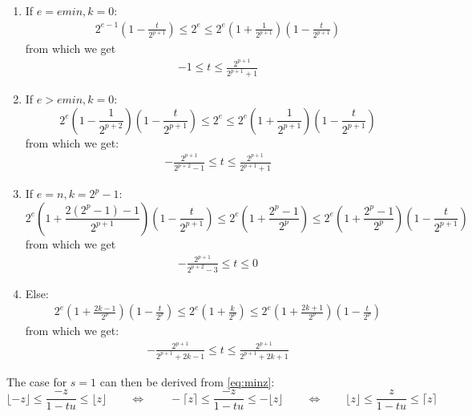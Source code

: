 \documentclass[10pt,a4paper]{article}
\theoremstyle{plain}
\theoremstyle{definition}
\newcommand{\ceil}[1]{\lceil #1 \rceil}
\newcommand{\floor}[1]{\lfloor #1 \rfloor}
\begin{document}
\begin{enumerate}
\item If $e=emin, k=0$:
\begin{align*}
2^{e-1}\left(1-\frac{t}{2^{p+1}}\right)\leq 2^e\leq 2^e\left(1+\frac{1}{2^{p+1}}\right)\left(1-\frac{t}{2^{p+1}}\right)
\end{align*}
from which we get
\begin{align}
-1\leq t\leq\frac{2^{p+1}}{2^{p+1}+1}\label{eq:trange1}
\end{align}
\item If $e>emin, k=0$:
\[
2^e\left(1-\frac{1}{2^{p+2}}\right)\left(1-\frac{t}{2^{p+1}}\right)\leq 2^e\leq 2^e\left(1+\frac{1}{2^{p+1}}\right)\left(1-\frac{t}{2^{p+1}}\right)
\]
from which we get:
\begin{align}
-\frac{2^{p+1}}{2^{p+2}-1}\leq t\leq \frac{2^{p+1}}{2^{p+1}+1}\label{eq:trange2}
\end{align}
\item If $e=n, k=2^p-1$:
\[
2^e\left(1+\frac{2(2^p-1)-1}{2^{p+1}}\right)\left(1-\frac{t}{2^{p+1}}\right)\leq 2^e\left(1+\frac{2^p-1}{2^p}\right) \leq 2^e\left(1+\frac{2^p-1}{2^p}\right)\left(1-\frac{t}{2^{p+1}}\right)
\]
from which we get
\begin{align}
-\frac{2^{p+1}}{2^{p+2}-3}\leq t\leq 0\label{eq:trange3}
\end{align}

\item Else: 
\begin{align*}
2^e\left(1+\frac{2k-1}{2^p}\right)\left(1-\frac{t}{2^p}\right)\leq 2^e\left(1+\frac{k}{2^p}\right)\leq 2^e\left(1+\frac{2k+1}{2^p}\right)\left(1-\frac{t}{2^p}\right)
\end{align*}
from which we get:
\begin{align}
-\frac{2^{p+1}}{2^{p+1}+2k-1}\leq t\leq \frac{2^{p+1}}{2^{p+1}+2k+1}\label{eq:trange4}
\end{align}
\end{enumerate}
The case for $s=1$ can then be derived from \eqref{eq:minz}:
\[
\floor{-z}\leq \frac{-z}{1-tu}\leq \floor{z} \qquad\Leftrightarrow\qquad -\ceil{z}\leq \frac{-z}{1-tu}\leq -\floor{z} \qquad\Leftrightarrow\qquad \floor{z}\leq \frac{z}{1-tu}\leq \ceil{z}
\]
\end{document}
